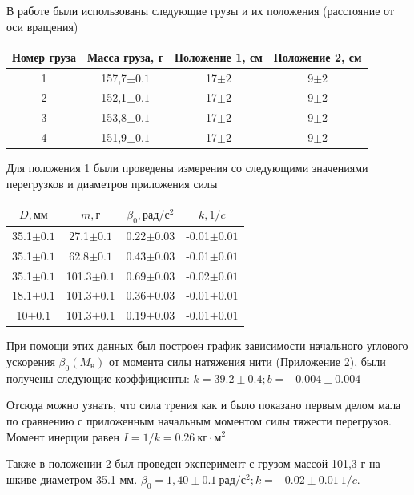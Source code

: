 \documentclass[a4paper]{article}
\begin{document}
В работе были использованы следующие грузы и их положения (расстояние от оси вращения)
\begin{table}[!ht]
    \centering
    \begin{tabular}{|c|c|c|c|}
    \hline
        Номер груза & Масса груза, г & Положение 1, см & Положение 2, см \\ \hline
        1 & 157,7$\pm 0.1$& 17$\pm 2$ & 9$\pm 2$ \\ \hline
        2 & 152,1$\pm 0.1$& 17$\pm 2$& 9$\pm 2$ \\ \hline
        3 & 153,8$\pm 0.1$& 17$\pm 2$& 9$\pm 2$ \\ \hline
        4 & 151,9$\pm 0.1$& 17$\pm 2$& 9$\pm 2$ \\ \hline
    \end{tabular}
\end{table}

Для положения 1 были проведены измерения со следующими значениями перегрузков и диаметров приложения силы
\begin{table}[!ht]
    \centering
    \begin{tabular}{|c|c|c|c|}
    \hline
        $D, мм$ & $m, г$ & $\beta_0, рад/с^2$ & $k, 1/c$ \\ \hline
        35.1$\pm 0.1$ & 27.1$\pm 0.1$ & 0.22$\pm 0.03$ & -0.01$\pm 0.01$ \\ \hline
        35.1$\pm 0.1$ & 62.8$\pm 0.1$ & 0.43$\pm 0.03$ & -0.01$\pm 0.01$ \\ \hline
        35.1$\pm 0.1$ & 101.3$\pm 0.1$ & 0.69$\pm 0.03$ & -0.02$\pm 0.01$ \\ \hline
        18.1$\pm 0.1$ & 101.3$\pm 0.1$ & 0.36$\pm 0.03$ & -0.01$\pm 0.01$ \\ \hline
        10$\pm 0.1$ & 101.3$\pm 0.1$ & 0.19$\pm 0.03$ & -0.01$\pm 0.01$ \\ \hline
    \end{tabular}
\end{table}
\newpage
При помощи этих данных был построен график зависимости начального углового ускорения $\beta_0(M_н)$ от момента силы натяжения нити (Приложение 2), были получены следующие коэффициенты:
\newline $k=39.2\pm0.4; b=-0.004\pm0.004$

Отсюда можно узнать, что сила трения как и было показано первым делом мала по сравнению с приложенным начальным моментом силы тяжести перегрузов. Момент инерции равен $I=1/k=0.26 \ кг\cdot м^2$

Также в положении 2 был проведен эксперимент с грузом массой 101,3 г на шкиве диаметром 35.1 мм. $\beta_0=1,40\pm0.1\ рад/с^2; k=-0.02\pm0.01\ 1/c$.
\end{document}
